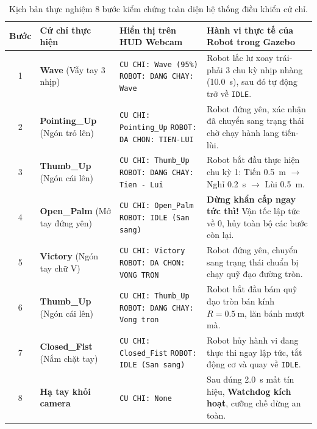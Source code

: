 \begin{table}[H]\centering
\footnotesize
\renewcommand{\arraystretch}{0.95}
\begin{tabularx}{\textwidth}{c l p{4.2cm} X}
\toprule
\textbf{Bước} & \textbf{Cử chỉ thực hiện} & \textbf{Hiển thị trên HUD Webcam} & \textbf{Hành vi thực tế của Robot trong Gazebo} \\
\midrule
1 & \textbf{Wave} (Vẫy tay 3 nhịp) & \texttt{CU CHI: Wave (95\%)} \newline \texttt{ROBOT: DANG CHAY: Wave} & Robot lắc lư xoay trái-phải 3 chu kỳ nhịp nhàng (\SI{10.0}{\second}), sau đó tự động trở về \texttt{IDLE}. \\
2 & \textbf{Pointing\_Up} (Ngón trỏ lên) & \texttt{CU CHI: Pointing\_Up} \newline \texttt{ROBOT: DA CHON: TIEN-LUI} & Robot đứng yên, xác nhận đã chuyển sang trạng thái chờ chạy hành lang tiến-lùi. \\
3 & \textbf{Thumb\_Up} (Ngón cái lên) & \texttt{CU CHI: Thumb\_Up} \newline \texttt{ROBOT: DANG CHAY: Tien - Lui} & Robot bắt đầu thực hiện chu kỳ 1: Tiến \SI{0.5}{\meter} $\to$ Nghỉ \SI{0.2}{\second} $\to$ Lùi \SI{0.5}{\meter}. \\
4 & \textbf{Open\_Palm} (Mở tay đứng yên) & \texttt{CU CHI: Open\_Palm} \newline \texttt{ROBOT: IDLE (San sang)} & \textbf{Dừng khẩn cấp ngay tức thì!} Vận tốc lập tức về 0, hủy toàn bộ các bước còn lại. \\
5 & \textbf{Victory} (Ngón tay chữ V) & \texttt{CU CHI: Victory} \newline \texttt{ROBOT: DA CHON: VONG TRON} & Robot đứng yên, chuyển sang trạng thái chuẩn bị chạy quỹ đạo đường tròn. \\
6 & \textbf{Thumb\_Up} (Ngón cái lên) & \texttt{CU CHI: Thumb\_Up} \newline \texttt{ROBOT: DANG CHAY: Vong tron} & Robot bắt đầu bám quỹ đạo tròn bán kính $R=\SI{0.5}{\meter}$, lăn bánh mượt mà. \\
7 & \textbf{Closed\_Fist} (Nắm chặt tay) & \texttt{CU CHI: Closed\_Fist} \newline \texttt{ROBOT: IDLE (San sang)} & Robot hủy hành vi đang thực thi ngay lập tức, tắt động cơ và quay về \texttt{IDLE}. \\
8 & \textbf{Hạ tay khỏi camera} & \texttt{CU CHI: None} & Sau đúng \SI{2.0}{\second} mất tín hiệu, \textbf{Watchdog kích hoạt}, cưỡng chế dừng an toàn. \\
\bottomrule
\end{tabularx}
\caption{Kịch bản thực nghiệm 8 bước kiểm chứng toàn diện hệ thống điều khiển cử chỉ.}
\label{tab:experiment_script}
\end{table}

